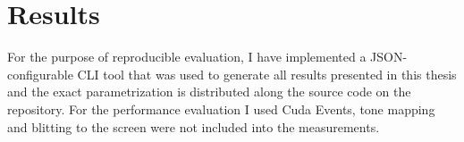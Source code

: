 \chapter{Results}
\label{chap:results}

For the purpose of reproducible evaluation, I have implemented a JSON-configurable CLI tool that was used to generate all results presented in this thesis and the exact parametrization is distributed along the source code on the repository.
For the performance evaluation I used Cuda Events, tone mapping and blitting to the screen were not included into the measurements.